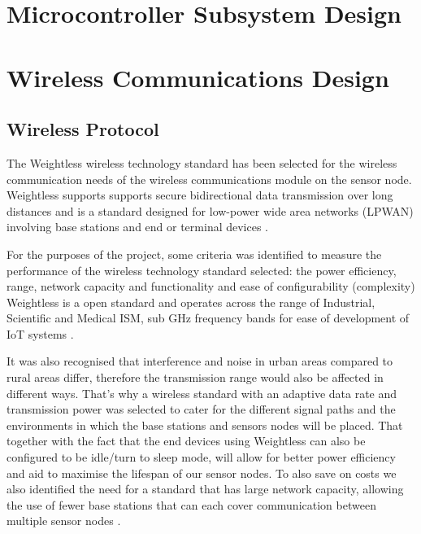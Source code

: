 \documentclass[12pt]{article}
\begin{document}
\section{Microcontroller Subsystem Design}

\section{Wireless Communications Design}

\subsection{Wireless Protocol}

The Weightless wireless technology standard has been selected for the wireless communication needs of the wireless 
communications module on the sensor node. Weightless supports supports secure bidirectional data transmission over long 
distances and is a standard designed for low-power wide area networks (LPWAN) involving base stations and end or terminal 
devices \parencite{whatweightless}.

For the purposes of the project, some criteria was identified to measure the performance of the wireless technology 
standard selected: the power efficiency, range, network capacity and  functionality and ease of configurability 
(complexity) Weightless is a open standard and operates across the range of Industrial, Scientific and Medical ISM, 
sub GHz  frequency bands for ease of development of IoT systems \parencite{gallorinichoose}. 

It was also recognised that interference and noise in urban areas compared to rural areas differ, therefore the 
transmission range would also be affected in different ways. That's why a wireless standard with an adaptive data rate 
and transmission power was selected to cater for the different signal paths and the environments in which the base 
stations and sensors nodes will be placed. That together with the fact that the end devices using Weightless can also be 
configured to be idle/turn to sleep mode, will allow for better power efficiency and aid to maximise the lifespan of our 
sensor nodes. 
To also save on costs we also identified the need for a standard that has large network capacity, allowing the use of 
fewer base stations that can each cover communication between multiple sensor nodes \parencite{frucirb}.

\end{document}
